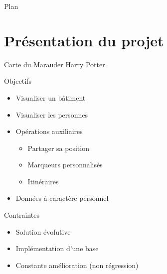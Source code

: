 \documentclass{beamer} %
\begin{document}

  \begin{frame}{Plan}
    \tableofcontents
  \end{frame}


  \section{Présentation du projet}
  \begin{frame}{\secname}
    \begin{center}
      Carte du Marauder Harry Potter.
    \end{center}

    \begin{block}{Objectifs}
      \begin{itemize}
        \item Visualiser un bâtiment
        \item Visualiser les personnes
        \item Opérations auxiliaires
        \begin{itemize}
          \item Partager sa position
          \item Marqueurs personnalisés
          \item Itinéraires
        \end{itemize}
        \item Données à caractère personnel
      \end{itemize}
    \end{block}
    
    \begin{alertblock}{Contraintes}
      \begin{itemize}
        \item Solution évolutive
        \item Implémentation d'une base
        \item Constante amélioration (non régression)
      \end{itemize}
    \end{alertblock}
    
  \end{frame}
\end{document}
